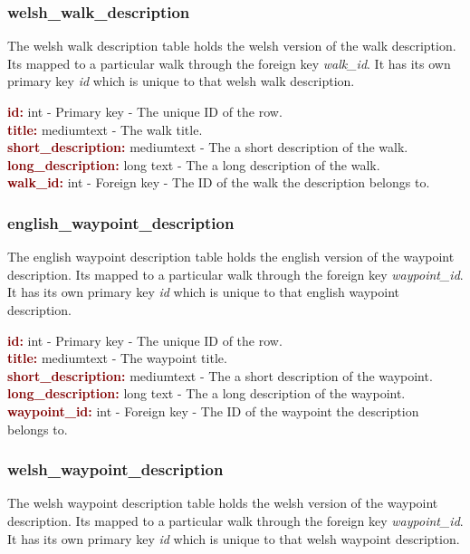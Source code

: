 \documentclass[11pt,a4paper]{report}
\begin{document}
\subsubsection{welsh\_walk\_description}
The welsh walk description table holds the welsh version of the walk description. Its mapped to a particular walk through the foreign key \textit{walk\_id}. It has its own primary key \textit{id} which is unique to that welsh walk description. 

\textbf{\textcolor{Maroon}{id:}} int - Primary key - The unique ID of the row. \\
\textbf{\textcolor{Maroon}{title:}} mediumtext -  The walk title.\\
\textbf{\textcolor{Maroon}{short\_description:}} mediumtext - The a short description of the walk.\\
\textbf{\textcolor{Maroon}{long\_description:}} long text - The a long description of the walk. \\
\textbf{\textcolor{Maroon}{walk\_id:}} int - Foreign key - The ID of the walk the description belongs to.

\subsubsection{english\_waypoint\_description}
The english waypoint description table holds the english version of the waypoint description. Its mapped to a particular walk through the foreign key \textit{waypoint\_id}. It has its own primary key \textit{id} which is unique to that english waypoint description. 

\textbf{\textcolor{Maroon}{id:}} int - Primary key - The unique ID of the row. \\
\textbf{\textcolor{Maroon}{title:}} mediumtext -  The waypoint title.\\
\textbf{\textcolor{Maroon}{short\_description:}} mediumtext - The a short description of the waypoint.\\
\textbf{\textcolor{Maroon}{long\_description:}} long text - The a long description of the waypoint. \\
\textbf{\textcolor{Maroon}{waypoint\_id:}} int - Foreign key - The ID of the waypoint the description belongs to.

\subsubsection{welsh\_waypoint\_description}
The welsh waypoint description table holds the welsh version of the waypoint description. Its mapped to a particular walk through the foreign key \textit{waypoint\_id}. It has its own primary key \textit{id} which is unique to that welsh waypoint description. 
\end{document}
